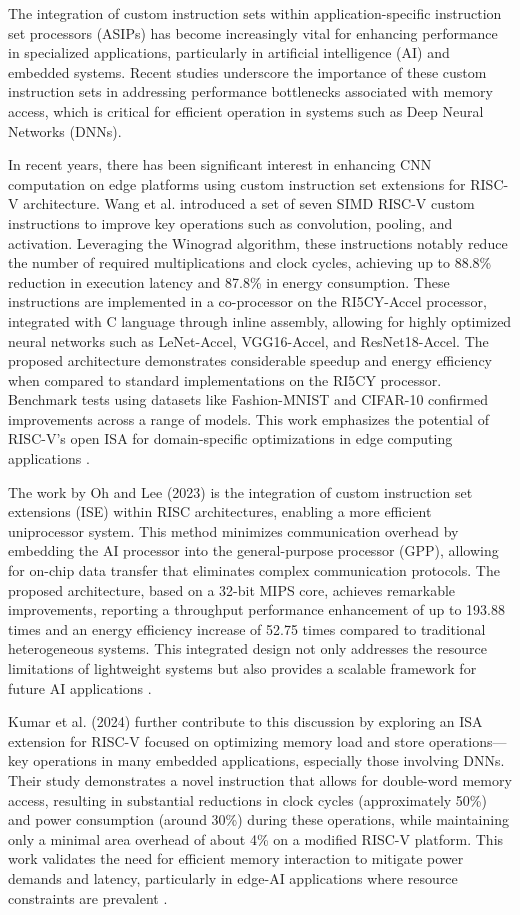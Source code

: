The integration of custom instruction sets within application-specific instruction set processors (ASIPs) has become increasingly vital for enhancing performance in specialized applications, particularly in artificial intelligence (AI) and embedded systems. Recent studies underscore the importance of these custom instruction sets in addressing performance bottlenecks associated with memory access, which is critical for efficient operation in systems such as Deep Neural Networks (DNNs).

In recent years, there has been significant interest in enhancing CNN computation on edge platforms using custom instruction set extensions for RISC-V architecture. Wang et al. introduced a set of seven SIMD RISC-V custom instructions to improve key operations such as convolution, pooling, and activation. Leveraging the Winograd algorithm, these instructions notably reduce the number of required multiplications and clock cycles, achieving up to 88.8\% reduction in execution latency and 87.8\% in energy consumption. These instructions are implemented in a co-processor on the RI5CY-Accel processor, integrated with C language through inline assembly, allowing for highly optimized neural networks such as LeNet-Accel, VGG16-Accel, and ResNet18-Accel. The proposed architecture demonstrates considerable speedup and energy efficiency when compared to standard implementations on the RI5CY processor. Benchmark tests using datasets like Fashion-MNIST and CIFAR-10 confirmed improvements across a range of models. This work emphasizes the potential of RISC-V's open ISA for domain-specific optimizations in edge computing applications \cite{wang2024optimizing}.


The work by Oh and Lee (2023) is the integration of custom instruction set extensions (ISE) within RISC architectures, enabling a more efficient uniprocessor system. This method minimizes communication overhead by embedding the AI processor into the general-purpose processor (GPP), allowing for on-chip data transfer that eliminates complex communication protocols. The proposed architecture, based on a 32-bit MIPS core, achieves remarkable improvements, reporting a throughput performance enhancement of up to 193.88 times and an energy efficiency increase of 52.75 times compared to traditional heterogeneous systems. This integrated design not only addresses the resource limitations of lightweight systems but also provides a scalable framework for future AI applications \cite{oh2023design}.


Kumar et al. (2024) further contribute to this discussion by exploring an ISA extension for RISC-V focused on optimizing memory load and store operations—key operations in many embedded applications, especially those involving DNNs. Their study demonstrates a novel instruction that allows for double-word memory access, resulting in substantial reductions in clock cycles (approximately 50\%) and power consumption (around 30\%) during these operations, while maintaining only a minimal area overhead of about 4\% on a modified RISC-V platform. This work validates the need for efficient memory interaction to mitigate power demands and latency, particularly in edge-AI applications where resource constraints are prevalent \cite{kumar2024implementation}.

